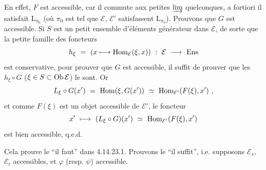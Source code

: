
En effet, $F$ est accessible, car il commute aux petites $\varinjlim$ quelconques, a fortiori il satisfait $\mathrm{L}_{\pi_0}$ (où $\pi_0$ est tel que $\mathcal{E}$, $\mathcal{E}'$ satisfassent $\mathrm{L}_{\pi_0}$). Prouvons que $G$ est accessible. Si $S$ est un
petit ensemble d'éléments générateur dans $\mathcal{E}$, de sorte que la petite famille des foncteurs
\[
h_\xi\ =\ (x\longmapsto\operatorname{Hom}_{\mathcal{E}}(\xi,x))\ :\ \mathcal{E}\ \longrightarrow\ \mathrm{Ens}
\]
est conservative, pour prouver que $G$ est accessible, il suffit de prouver que les $h_\xi\circ G$ ($\xi\in S\subset\operatorname{Ob}\mathcal{E}$) le sont. Or
\[
L_\xi\circ G(x')\ =\ \Hom(\xi,G(x'))\ \simeq\ \Hom_{\mathcal{E}'}(F(\xi),x')\ , %
\]
et comme $F(\xi)$ est un objet accessible de $\mathcal{E}'$, le foncteur
\[
x'\ \longmapsto\ (L_\xi\circ G)(x')\ \simeq\ \Hom_{\mathcal{E}'}(F(\xi),x') %
\]
est bien accessible, q.e.d.

Cela prouve le “il faut” dans 4.14.23.1. Prouvons le “il suffit”, i.e. supposons $\mathcal{E}_s$, $\mathcal{E}_t$ accessibles, et $\varphi$ (resp. $\psi$) accessible.


